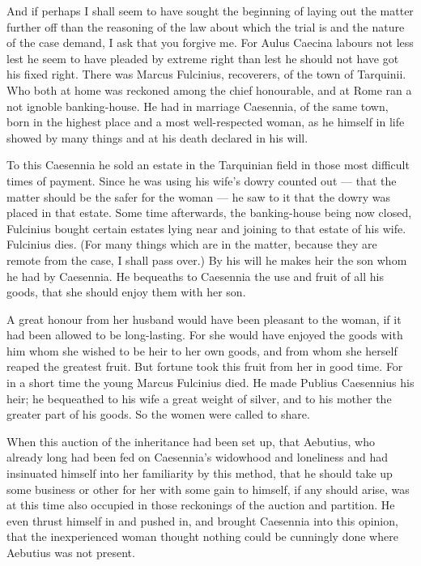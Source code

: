  And if perhaps I shall seem to have sought the beginning of laying out the matter further off than the reasoning of the law about which the trial is and the nature of the case demand, I ask that you forgive me. For Aulus Caecina labours not less lest he seem to have pleaded by extreme right than lest he should not have got his fixed right. There was Marcus Fulcinius, recoverers, of the town of Tarquinii. Who both at home was reckoned among the chief honourable, and at Rome ran a not ignoble banking-house. He had in marriage Caesennia, of the same town, born in the highest place and a most well-respected woman, as he himself in life showed by many things and at his death declared in his will.

 To this Caesennia he sold an estate in the Tarquinian field in those most difficult times of payment. Since he was using his wife's dowry counted out --- that the matter should be the safer for the woman --- he saw to it that the dowry was placed in that estate. Some time afterwards, the banking-house being now closed, Fulcinius bought certain estates lying near and joining to that estate of his wife. Fulcinius dies. (For many things which are in the matter, because they are remote from the case, I shall pass over.) By his will he makes heir the son whom he had by Caesennia. He bequeaths to Caesennia the use and fruit of all his goods, that she should enjoy them with her son.

 A great honour from her husband would have been pleasant to the woman, if it had been allowed to be long-lasting. For she would have enjoyed the goods with him whom she wished to be heir to her own goods, and from whom she herself reaped the greatest fruit. But fortune took this fruit from her in good time. For in a short time the young Marcus Fulcinius died. He made Publius Caesennius his heir; he bequeathed to his wife a great weight of silver, and to his mother the greater part of his goods. So the women were called to share.

 When this auction of the inheritance had been set up, that Aebutius, who already long had been fed on Caesennia's widowhood and loneliness and had insinuated himself into her familiarity by this method, that he should take up some business or other for her with some gain to himself, if any should arise, was at this time also occupied in those reckonings of the auction and partition. He even thrust himself in and pushed in, and brought Caesennia into this opinion, that the inexperienced woman thought nothing could be cunningly done where Aebutius was not present.

